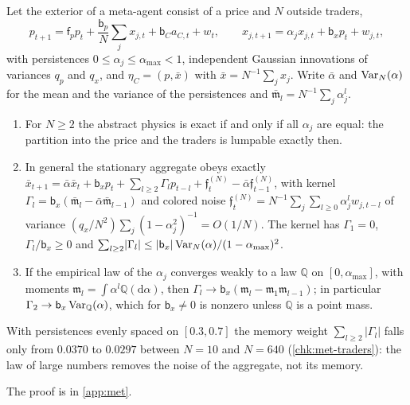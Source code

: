 \begin{example}\label{ex:met-traders}
Let the exterior of a meta-agent consist of a price and $N$ outside traders,
\begin{equation}\label{eq:met-traders}
p_{t+1}=\mathsf f_pp_t+\frac{\mathsf b_p}N\sum_jx_{j,t}+\mathsf b_Ca_{C,t}+w_t,\qquad x_{j,t+1}=\alpha_jx_{j,t}+\mathsf b_xp_t+w_{j,t},
\end{equation}
with persistences $0\le\alpha_j\le\alpha_{\max}<1$, independent Gaussian innovations of variances $q_p$ and $q_x$, and $\eta_C=(p,\bar x)$ with $\bar x=N^{-1}\sum_jx_j$. Write $\bar\alpha$ and $\operatorname{Var}_N(\alpha)$ for the mean and the variance of the persistences and $\bar{\mathfrak m}_l=N^{-1}\sum_j\alpha_j^l$.
\begin{enumerate}
\item[(a)] For $N\ge2$ the abstract physics is exact if and only if all $\alpha_j$ are equal: the partition into the price and the traders is lumpable exactly then.
\item[(b)] In general the stationary aggregate obeys exactly $\bar x_{t+1}=\bar\alpha\bar x_t+\mathsf b_xp_t+\sum_{l\ge2}\Gamma_lp_{t-l}+\mathfrak f^{(N)}_t-\bar\alpha\mathfrak f^{(N)}_{t-1}$, with kernel $\Gamma_l=\mathsf b_x(\bar{\mathfrak m}_l-\bar\alpha\bar{\mathfrak m}_{l-1})$ and colored noise $\mathfrak f^{(N)}_t=N^{-1}\sum_j\sum_{l\ge0}\alpha_j^lw_{j,t-l}$ of variance $(q_x/N^2)\sum_j(1-\alpha_j^2)^{-1}=O(1/N)$. The kernel has $\Gamma_1=0$, $\Gamma_l/\mathsf b_x\ge0$ and $\sum_{l\ge2}\lvert\Gamma_l\rvert\le\lvert\mathsf b_x\rvert\operatorname{Var}_N(\alpha)/(1-\alpha_{\max})^2$.
\item[(c)] If the empirical law of the $\alpha_j$ converges weakly to a law $\mathbb Q$ on $[0,\alpha_{\max}]$, with moments $\mathfrak m_l=\int\alpha^l\mathbb Q(\mathrm d\alpha)$, then $\Gamma_l\to\mathsf b_x(\mathfrak m_l-\mathfrak m_1\mathfrak m_{l-1})$; in particular $\Gamma_2\to\mathsf b_x\operatorname{Var}_{\mathbb Q}(\alpha)$, which for $\mathsf b_x\neq0$ is nonzero unless $\mathbb Q$ is a point mass.
\end{enumerate}
With persistences evenly spaced on $[0.3,0.7]$ the memory weight $\sum_{l\ge2}\lvert\Gamma_l\rvert$ falls only from $0.0370$ to $0.0297$ between $N=10$ and $N=640$ (\cref{chk:met-traders}): the law of large numbers removes the noise of the aggregate, not its memory.
\end{example}
The proof is in \cref{app:met}.


